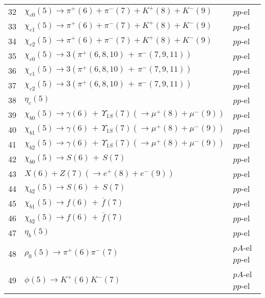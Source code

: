\documentclass[12pt]{article}
\begin{document}
\begin{center}
\begin{table}[htbp!]
\begin{tabular}{|c|l|l|}
32 & $\chi_{c0}(5)\to \pi^+(6)+\pi^-(7)+K^+(8)+K^-(9)$ &  $pp$-el  \\

33 & $\chi_{c1}(5)\to \pi^+(6)+\pi^-(7)+K^+(8)+K^-(9)$ &  $pp$-el  \\

34 & $\chi_{c2}(5)\to \pi^+(6)+\pi^-(7)+K^+(8)+K^-(9)$ &  $pp$-el  \\

35 & $\chi_{c0}(5)\to 3(\pi^+(6,8,10)\,+\,\pi^-(7,9,11))$ &  $pp$-el  \\

36 & $\chi_{c1}(5)\to 3(\pi^+(6,8,10)\,+\,\pi^-(7,9,11))$ &  $pp$-el  \\

37 & $\chi_{c2}(5)\to 3(\pi^+(6,8,10)\,+\,\pi^-(7,9,11))$ &  $pp$-el  \\

38 & $\eta_c(5)$ &  $pp$-el  \\

39 & $\chi_{b0}(5)\to \gamma(6)\,+\,\Upsilon_{1S}(7)(\to \mu^+(8)+\mu^-(9))$ &  $pp$-el  \\

40 & $\chi_{b1}(5)\to \gamma(6)\,+\,\Upsilon_{1S}(7)(\to \mu^+(8)+\mu^-(9))$ &  $pp$-el  \\

41 & $\chi_{b2}(5)\to \gamma(6)\,+\,\Upsilon_{1S}(7)(\to \mu^+(8)+\mu^-(9))$ &  $pp$-el  \\

42 & $\chi_{b0}(5)\to S(6)\,+\,S(7)$ &  $pp$-el  \\

43 & $X(6) + Z(7)(\to e^+ (8)+ e^- (9))$ &  $pp$-el  \\

44 & $\chi_{b2}(5)\to S(6)\,+\,S(7)$ &  $pp$-el  \\

45 & $\chi_{b1}(5)\to f(6)\,+\,\overline{f}(7)$ &  $pp$-el  \\

46 & $\chi_{b2}(5)\to f(6)\,+\,\overline{f}(7)$ &  $pp$-el  \\

47 &  $\eta_b(5)$ &  $pp$-el  \\

48 & $\rho_0(5)\to \pi^+(6)\pi^-(7)$ &  $pA$-el  $pp$-el  \\

49 & $\phi(5)\to K^+(6)K^-(7)$ &  $pA$-el  $pp$-el  \\


\end{tabular}
\end{table}
\end{center}
\end{document}
